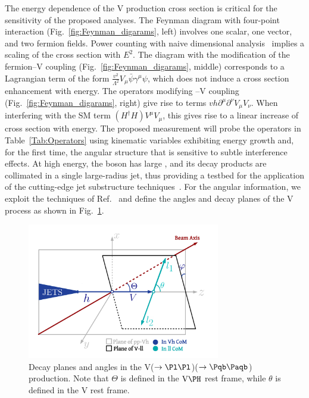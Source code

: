 \documentclass[a4paper,11pt]{article}
\newcommand{\Pb}{{{\Pqb}}\xspace}
\newcommand{\PAb}{{{{\Paqb}}}\xspace}
\renewcommand{\PV}{{{{V}}}\xspace}
\newcommand{\VH}{{{\PV}{\PH}}\xspace}
\begin{document}
The energy dependence of the \VH production cross section is critical for the sensitivity of the proposed analyses. 
The Feynman diagram with four-point interaction (Fig.~\ref{fig:Feynman_digarams}, left) involves one scalar, one vector, and two fermion fields.
Power counting with naive dimensional analysis~\cite{Manohar:1983md} implies a scaling of the cross section with $E^2$. 
The diagram with the modification of the fermion--{\PV} coupling (Fig.~\ref{fig:Feynman_digarams}, middle) 
corresponds to a Lagrangian term  of the form $\frac{v^2}{{\Lambda}^2} V_{\mu} \bar{\psi} {{\gamma}^{\mu}} {\psi}$, which does not induce a cross section enhancement with energy. 
The operators modifying \PH--\PV coupling (Fig.~\ref{fig:Feynman_digarams}, right) give rise to terms $vh {\partial}^{\mu}{\partial}^{\nu} V_{\mu}V_{\nu}$.
When interfering with the SM term $(H^{\dagger}H) V^{\mu}V_{\mu}$, this gives rise to a linear increase of cross section with energy.
The proposed measurement will probe the operators in Table~\ref{Tab:Operators} 
using kinematic variables exhibiting energy growth and, for the first time, the angular structure that is sensitive to subtle interference effects.
At high energy, the \PH boson has large \pt, and its decay products are collimated in a single large-radius jet, thus providing a testbed for the application of the cutting-edge jet substructure techniques~\cite{Qu:2019gqs,Sirunyan:2020lcu}.
For the angular information, we exploit the techniques of Ref.~\cite{Banerjee:2019twi} and define the angles and decay planes of the \VH process as shown in Fig.~\ref{fig:HelicityFrame}.

\begin{figure}[hbtp]
\begin{center}
\includegraphics[width=0.75\textwidth]{Figures/LHE/TheThreeAnglesVh.pdf}
\end{center}
\caption{
Decay planes and angles in the \PV($\rightarrow \textrm{\Pl} \textrm{\Pl}$)\PH($\rightarrow \Pb \PAb$) production. Note that $\Theta$ is defined in the $\textrm{\PV}\PH$ rest frame, while $\theta$ is defined in the \PV rest frame.
}
\label{fig:HelicityFrame}
\end{figure}
\end{document}
